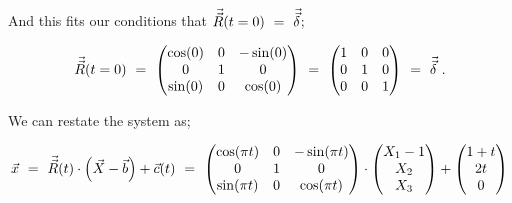\documentclass{article}
\begin{document}
And this fits our conditions that \begin{math} \vec{\vec{R}}( t = 0 ) \hspace{0.125cm} = \hspace{0.125cm} \vec{\vec{\delta}} \end{math};

\begin{equation} \label{eq:1}
\vec{\vec{R}}( t = 0 ) \hspace{0.125cm} =  \hspace{0.125cm} \begin{pmatrix} \cos ( 0 ) & 0 & - \sin ( 0 ) \\ 0 & 1 & 0 \\ \sin ( 0 ) & 0 & \cos ( 0 ) \end{pmatrix} \hspace{0.125cm} =  \hspace{0.125cm} \begin{pmatrix} 1 & 0 & 0 \\ 0 & 1 & 0 \\ 0 & 0 & 1 \end{pmatrix} \hspace{0.125cm} =  \hspace{0.125cm} \vec{\vec{\delta}} \hspace{0.125cm} .
\end{equation} 

\vspace{0.25cm}

We can restate the system as;

\begin{equation} \label{eq:1}
\vec{x}  \hspace{0.125cm} =  \hspace{0.125cm} \vec{\vec{R}}( t ) \cdot \Big( \vec{X} - \vec{b} \Big) + \vec{c}( t ) \hspace{0.125cm} =  \hspace{0.125cm} \begin{pmatrix} \cos ( \pi t ) & 0 & - \sin ( \pi t ) \\ 0 & 1 & 0 \\ \sin ( \pi t ) & 0 & \cos ( \pi t ) \end{pmatrix} \cdot \begin{pmatrix} X_1 - 1 \\ X_2 \\ X_3 \end{pmatrix} + \begin{pmatrix} 1 + t \\ 2 t \\ 0 \end{pmatrix}
\end{equation} 
\end{document}
